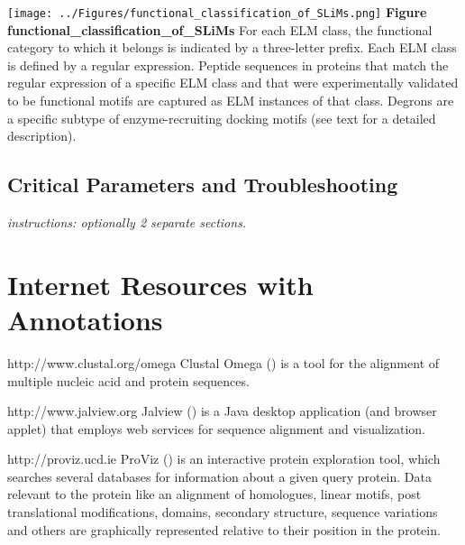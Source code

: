 \texttt{[image: ../Figures/functional\_classification\_of\_SLiMs.png]}
\textbf{Figure functional\_classification\_of\_SLiMs} For each ELM
class, the functional category to which it belongs is indicated by a
three-letter prefix. Each ELM class is defined by a regular expression.
Peptide sequences in proteins that match the regular expression of a
specific ELM class and that were experimentally validated to be
functional motifs are captured as ELM instances of that class. Degrons
are a specific subtype of enzyme-recruiting docking motifs (see text for
a detailed description).

\subsection{Critical Parameters and
Troubleshooting}\label{critical-parameters-and-troubleshooting}

\emph{instructions: optionally 2 separate sections.}

\section{Internet Resources with
Annotations}\label{internet-resources-with-annotations}

http://www.clustal.org/omega Clustal Omega (\cite{21988835}) is a tool
for the alignment of multiple nucleic acid and protein sequences.

http://www.jalview.org Jalview (\cite{19151095}) is a Java desktop
application (and browser applet) that employs web services for sequence
alignment and visualization.

http://proviz.ucd.ie ProViz (\cite{27085803}) is an interactive protein
exploration tool, which searches several databases for information about
a given query protein. Data relevant to the protein like an alignment of
homologues, linear motifs, post translational modifications, domains,
secondary structure, sequence variations and others are graphically
represented relative to their position in the protein.
